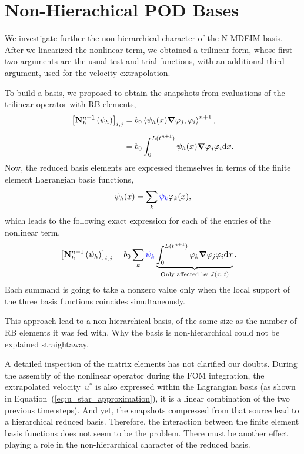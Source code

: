 \documentclass[../../thesis.tex]{subfiles}
\newcommand{\inner}[2]{\left<#1, #2\right>}
\newcommand{\Ah}[1]{\ensuremath{\vb{#1}^{n+1}_h}}
\begin{document}
\section{Non-Hierachical POD Bases}
We investigate further the non-hierarchical character of the N-MDEIM basis.
After we linearized the nonlinear term, we obtained a trilinear form,
whose first two arguments are the usual test and trial functions,
with an additional third argument, used for the velocity extrapolation.

To build a basis, we proposed to obtain the snapshots from evaluations 
of the trilinear operator with RB elements,
\begin{equation}
    \begin{split}
        \qty[\Ah{N}\left(\psi_{h}\right)]_{i,j}
        &= b_0 \inner{\psi_h(x)\grad \varphi_j}{\varphi_i}^{n+1},
        \\[2mm]
        &= b_0 \int_{0}^{L(t^{n+1})} \psi_h(x) \grad \varphi_j \varphi_i \dd x.
    \end{split}
\end{equation}
Now, the reduced basis elements are expressed themselves in terms of 
the finite element Lagrangian basis functions,
\begin{equation}
    \psi_h(x) = \sum_{k} 
    \textcolor{blue}{\psi_k} 
    \varphi_{k}(x),
\end{equation}
which leads to the following exact expression for each of the entries of the nonlinear term,
\begin{equation}
    \begin{split}
        \qty[\Ah{N}\left(\psi_{h}\right)]_{i,j}
        &= b_0 \sum_k 
        \textcolor{blue}{\psi_k} 
        \underbrace{\int_{0}^{L(t^{n+1})} 
        \varphi_{k} \grad \varphi_j \varphi_i \dd x}_{\text{Only affected by $J(x, t)$}}.
    \end{split}
    \label{eq:appendix_exact_representation_triliear_form}
\end{equation}
Each summand is going to take a nonzero value only when the local support of the three
basis functions coincides simultaneously.

This approach lead to a non-hierarchical basis, 
of the same size as the number of RB elements it was fed with.
Why the basis is non-hierarchical could not be explained straightaway.

A detailed inspection of the matrix elements has not clarified our doubts.
During the assembly of the nonlinear operator during the FOM integration, 
the extrapolated velocity~$u^{*}$ is also expressed within the Lagrangian basis
(as shown in Equation~(\ref{eq:u_star_approximation}), 
it is a linear combination of the two previous time steps).
And yet, the snapshots compressed from that source lead to a hierarchical reduced basis.
Therefore, the interaction between the finite element basis functions
does not seem to be the problem. 
There must be another effect playing a role 
in the non-hierarchical character of the reduced basis.
\end{document}
